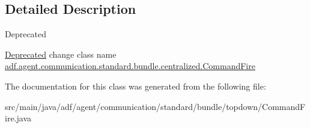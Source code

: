 \subsection{Detailed Description}
\begin{DoxyRefDesc}{Deprecated}
\item[\hyperlink{deprecated__deprecated000002}{Deprecated}]change class name \hyperlink{classadf_1_1agent_1_1communication_1_1standard_1_1bundle_1_1centralized_1_1CommandFire}{adf.\+agent.\+communication.\+standard.\+bundle.\+centralized.\+Command\+Fire} \end{DoxyRefDesc}


The documentation for this class was generated from the following file\+:\begin{DoxyCompactItemize}
\item 
src/main/java/adf/agent/communication/standard/bundle/topdown/Command\+Fire.\+java\end{DoxyCompactItemize}
